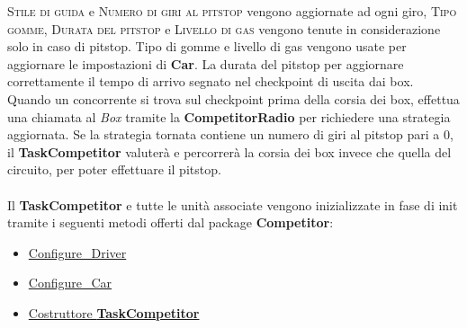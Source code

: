 \textsc{Stile di guida} e \textsc{Numero di giri al pitstop} vengono aggiornate ad ogni giro, \textsc{Tipo gomme}, \textsc{Durata del pitstop}
e \textsc{Livello di gas} vengono tenute in considerazione solo in caso di pitstop. Tipo di gomme e livello di gas vengono usate per aggiornare
le impostazioni di \textbf{Car}. La durata del pitstop per aggiornare correttamente il tempo di arrivo segnato nel checkpoint di uscita
dai box.\\
Quando un concorrente si trova sul checkpoint prima della corsia dei box, effettua una chiamata al \emph{Box} tramite la \textbf{CompetitorRadio}
per richiedere una strategia aggiornata. Se la strategia tornata contiene un numero di giri al pitstop pari a 0, il \textbf{TaskCompetitor}
valuter\`{a} e percorrer\`{a} la corsia dei box invece che quella del circuito, per poter effettuare il pitstop.\\\\
Il \textbf{TaskCompetitor} e tutte le unit\`{a} associate vengono inizializzate in fase di init tramite i seguenti metodi offerti dal package
\textbf{Competitor}:
\begin{itemize}
\item \underline{Configure\_Driver}
\item \underline{Configure\_Car}
\item \underline{Costruttore \textbf{TaskCompetitor}}
\end{itemize}
\newpage
